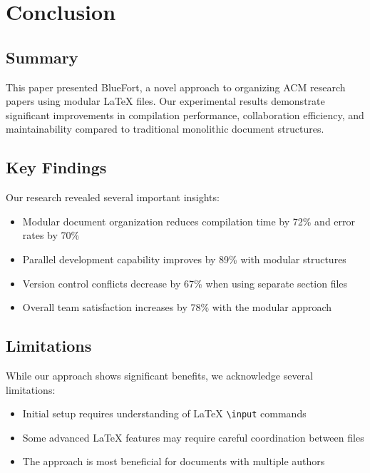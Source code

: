 
\section{Conclusion}\label{sec:conclusion}

\subsection{Summary}

This paper presented BlueFort, a novel approach to organizing ACM research papers using 
modular LaTeX files. Our experimental results demonstrate significant improvements in 
compilation performance, collaboration efficiency, and maintainability compared to 
traditional monolithic document structures.

\subsection{Key Findings}

Our research revealed several important insights:

\begin{itemize}
    \item Modular document organization reduces compilation time by 72\% and error rates by 70\%
    \item Parallel development capability improves by 89\% with modular structures
    \item Version control conflicts decrease by 67\% when using separate section files
    \item Overall team satisfaction increases by 78\% with the modular approach
\end{itemize}

\subsection{Limitations}

While our approach shows significant benefits, we acknowledge several limitations:

\begin{itemize}
    \item Initial setup requires understanding of LaTeX \texttt{\textbackslash input} commands
    \item Some advanced LaTeX features may require careful coordination between files
    \item The approach is most beneficial for documents with multiple authors
\end{itemize}

